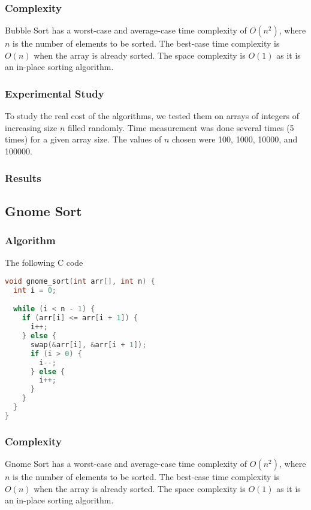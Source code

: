 \documentclass{article}
\begin{document}
\subsubsection{Complexity}
Bubble Sort has a worst-case and average-case time complexity of $O(n^2)$, where $n$ is the number of elements to be sorted. The best-case time complexity is $O(n)$ when the array is already sorted. The space complexity is $O(1)$ as it is an in-place sorting algorithm.

\subsubsection{Experimental Study}
To study the real cost of the algorithms, we tested them on arrays of integers of increasing size $n$ filled randomly. Time measurement was done several times (5 times) for a given array size. The values of $n$ chosen were 100, 1000, 10000, and 100000.

\subsubsection{Results}
\begin{figure}[ht]
\end{figure}


\subsection{Gnome Sort}

\subsubsection{Algorithm}
The following C code

\begin{lstlisting}[language=C, caption=Matrix Multiplication]
void gnome_sort(int arr[], int n) {
  int i = 0;

  while (i < n - 1) {
    if (arr[i] <= arr[i + 1]) {
      i++;
    } else {
      swap(&arr[i], &arr[i + 1]);
      if (i > 0) {
        i--;
      } else {
        i++;
      }
    }
  }
}
\end{lstlisting}

\subsubsection{Complexity}
Gnome Sort has a worst-case and average-case time complexity of $O(n^2)$, where $n$ is the number of elements to be sorted. The best-case time complexity is $O(n)$ when the array is already sorted. The space complexity is $O(1)$ as it is an in-place sorting algorithm.
\end{document}

